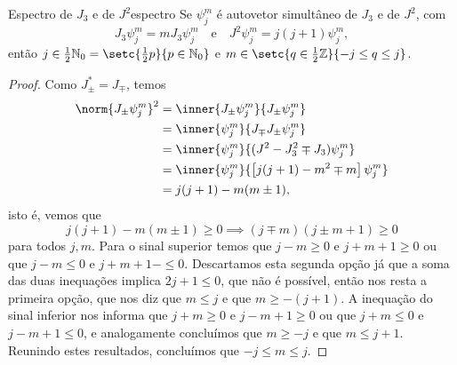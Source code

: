 \begin{proposition}{Espectro de \(J_3\) e de \(J^2\)}{espectro}
    Se \(\psi_{j}^m\) é autovetor simultâneo de \(J_3\) e de \(J^2\), com
    \begin{equation*}
        J_3 \psi_{j}^{m} = m J_3 \psi_{j}^m\quad\text{e}\quad J^2 \psi_{j}^{m} = j(j+1) \psi_{j}^m,
    \end{equation*}
    então \(j \in \frac12 \mathbb{N}_0 = \setc{\frac12 p}{p \in \mathbb{N}_0}\) e \(m \in \setc{q\in \frac12 \mathbb{Z}}{-j \leq q \leq j}\).
\end{proposition}
\begin{proof}
    Como \(J_{\pm}^* = J_\mp\), temos
    \begin{align*}
        \norm{J_\pm \psi^m_j}^2 &= \inner{J_\pm\psi_j^m}{J_\pm \psi_{j}^m}\\
                                &= \inner{\psi_j^m}{J_\mp J_\pm \psi_j^m}\\
                                &= \inner{\psi_j^m}{(J^2 - J_3^2 \mp J_3)\psi_j^m}\\
                                &= \inner{\psi_j^m}{\left[j(j+1) - m^2 \mp m\right]\psi_j^m}\\
                                &= j(j+1) - m(m \pm 1),
    \end{align*}
    isto é, vemos que
    \begin{equation*}
        j(j + 1) - m(m \pm 1) \geq 0 \implies (j \mp m)(j \pm m + 1) \geq 0
    \end{equation*}
    para todos \(j,m\). Para o sinal superior temos que \(j - m \geq 0\) e \(j + m + 1 \geq 0\) ou que \(j - m \leq 0\) e \(j + m + 1 - \leq 0\). Descartamos esta segunda opção já que a soma das duas inequações implica \(2j + 1 \leq 0\), que não é possível, então nos resta a primeira opção, que nos diz que \(m \leq j\) e que \(m \geq -(j+1)\). A inequação do sinal inferior nos informa que \(j + m \geq 0\) e \(j - m + 1 \geq 0\) ou que \(j + m \leq 0\) e \(j - m + 1 \leq 0\), e analogamente concluímos que \(m \geq -j\) e que \(m \leq j+1\). Reunindo estes resultados, concluímos que \(-j \leq m \leq j\).


\end{proof}
